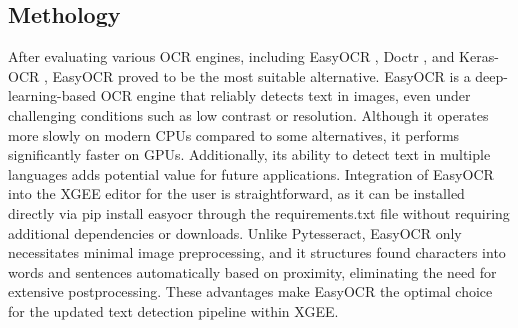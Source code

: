 \subsection{Methology}
After evaluating various OCR engines, including EasyOCR \cite{easyocr_doc}, Doctr \cite{doctr_doc}, and Keras-OCR \cite{keras_ocr_doc}, EasyOCR proved to be the most suitable alternative.
EasyOCR is a deep-learning-based OCR engine that reliably detects text in images, even under challenging conditions such as low contrast or resolution. Although it operates more slowly on modern CPUs compared to some alternatives, it performs significantly faster on GPUs. Additionally, its ability to detect text in multiple languages adds potential value for future applications. Integration of EasyOCR into the XGEE editor for the user is straightforward, as it can be installed directly via pip install easyocr through the requirements.txt file without requiring additional dependencies or downloads. Unlike Pytesseract, EasyOCR only necessitates minimal image preprocessing, and it structures found characters into words and sentences automatically based on proximity, eliminating the need for extensive postprocessing. These advantages make EasyOCR the optimal choice for the updated text detection pipeline within XGEE.

